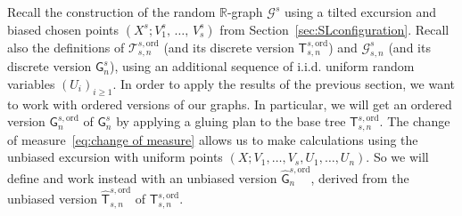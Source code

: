 \documentclass[10pt]{amsart}
\theoremstyle{definition}\newtheorem{defi}[theo]{Definition}\newtheorem{rema}[theo]{Remark}\newtheorem{exam}[theo]{Example}\newtheorem{exem}[theo]{Example}\newtheorem{nota}[theo]{Notation}
\newcommand{\ord}{\mathrm{ord}}
\newcommand{\cG}{\mathcal{G}}
\newcommand{\cT}{\mathcal{T}}
\newcommand{\sG}{\mathsf{G}}
\newcommand{\sT}{\mathsf{T}}
\newcommand{\R}{\mathbb{R}}
\begin{document}
Recall the construction of the random $\R$-graph $\cG^{s}$ using a tilted excursion and biased chosen points $(X^s;V_1^s,\,\dots,\,V_s^s)$ from Section~\ref{sec:SLconfiguration}. Recall also the definitions of $\cT_{s,n}^{s,\ord}$ (and its discrete version $\sT_{s,n}^{s,\ord}$) and $\cG_{s,n}^s$ (and its discrete version $\sG_{n}^{s}$), using an additional sequence of i.i.d. uniform random variables $(U_i)_{i\geq 1}$. In order to apply the results of the previous section, we want to work with ordered versions of our graphs. In particular, we will get an ordered version $\sG_n^{s,\ord}$ of $\sG_n^s$ by applying a gluing plan to the base tree $\sT_{s,n}^{s,\ord}$. The change of measure~\eqref{eq:change of measure} allows us to make calculations using the unbiased excursion with uniform points $(X;V_1,\dots,V_s, U_1, \ldots, U_n)$. So we will define and work instead with an unbiased version $\widehat{\sG}_{n}^{s,\ord}$, derived from the unbiased version $\widehat{\sT}_{s,n}^{s,\ord}$ of $\sT_{s,n}^{s,\ord}$.
\end{document}
